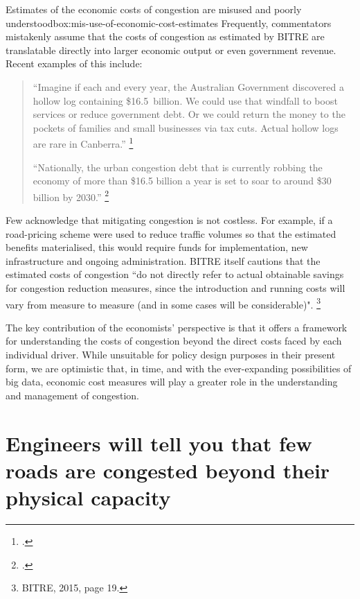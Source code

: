 \documentclass{grattan}
\begin{document}
\begin{smallbox}{Estimates of the economic costs of congestion are misused and poorly understood}{box:mis-use-of-economic-cost-estimates}
Frequently, commentators mistakenly assume that the costs of congestion as estimated by BITRE are translatable directly into larger economic output or even government revenue.
Recent examples of this include:

\microtypeforquote
\begin{quote}
\textquotedblleft Imagine if each and every year, the Australian Government discovered a hollow log containing \$16.5~billion. We could use that windfall to boost services or reduce government debt. Or we could return the money to the pockets of families and small businesses via tax cuts. Actual hollow logs are rare in Canberra.''%
    \footcite{Albanese-2017-Congestion-handbrake-on-growth}

``Nationally, the urban congestion debt that is currently robbing the economy of more than \$16.5 billion a year is set to soar to around \$30 billion by 2030.''%
    \footcite{Chester-VTA-2017-Freight-speech}

\end{quote}

Few acknowledge that mitigating congestion is not costless. For example, if a road-pricing scheme were used to reduce traffic volumes so that the estimated benefits materialised, this would require funds for implementation, new infrastructure and ongoing administration. BITRE itself cautions that the estimated costs of congestion ``do not directly refer to actual obtainable savings for congestion reduction measures, since the introduction and running costs will vary from measure to measure (and in some cases will be considerable)".%
    \footnote{BITRE, 2015, page 19.}
\end{smallbox}

The key contribution of the economists' perspective is that it offers a framework for understanding the costs of congestion beyond the direct costs faced by each individual driver. While unsuitable for policy design purposes in their present form, we are optimistic that, in time, and with the ever-expanding possibilities of big data, economic cost measures will play a greater role in the understanding and management of congestion. 

\section{Engineers will tell you that few roads are congested beyond their physical capacity}\label{subsec:quantifying-capacity}
\end{document}
